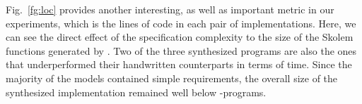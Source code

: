 Fig.~\ref{fg:loc} provides another interesting, as well as important metric in
our experiments, which is the lines of code in each pair of implementations.
Here, we can see the direct effect of the specification complexity to the size
of the Skolem functions generated by \aeval. Two of the three synthesized
programs are also the ones that underperformed their handwritten counterparts in
terms of time. Since the majority of the models contained simple
requirements, the overall size of the synthesized implementation remained well below \lustrev-programs.
%

